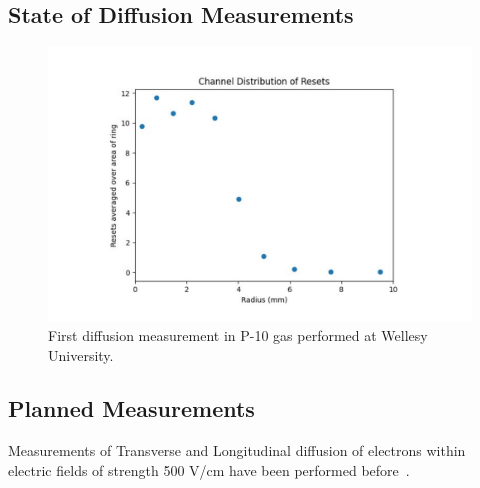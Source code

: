 \subsection{State of Diffusion Measurements}

\begin{figure}[]
\centering
\includegraphics[width=\textwidth]{images/SAQ_first_diffusion_measurement.pdf}
\caption{First diffusion measurement in P-10 gas performed at Wellesy University.}
\label{fig:saq_first_diffusion_measurement}
\end{figure}

\subsection{Planned Measurements}

Measurements of Transverse and Longitudinal diffusion of electrons within electric fields of strength 500 V/cm have been performed before~\citep{lar_diffusion_measurement_LI2016160}.

